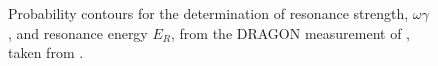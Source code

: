 \begin{figure}
\begin{center}
\caption{Probability contours for the determination of resonance strength, $\omega\gamma$, and resonance energy $E_{R}$, from the DRAGON measurement of , taken from \cite{eri10}.}
\end{center}
\end{figure}